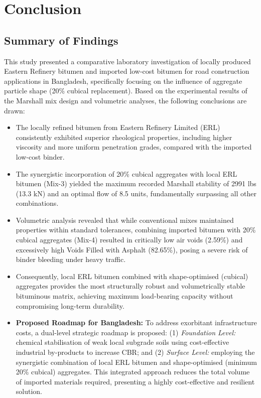 \documentclass[12pt,a4paper]{article}
\begin{document}
\section{Conclusion}

\subsection{Summary of Findings}
This study presented a comparative laboratory investigation of locally produced Eastern Refinery bitumen and imported low-cost bitumen for road construction applications in Bangladesh, specifically focusing on the influence of aggregate particle shape (20\% cubical replacement). Based on the experimental results of the Marshall mix design and volumetric analyses, the following conclusions are drawn:
\begin{itemize}
    \item The locally refined bitumen from Eastern Refinery Limited (ERL) consistently exhibited superior rheological properties, including higher viscosity and more uniform penetration grades, compared with the imported low-cost binder.
    \item The synergistic incorporation of 20\% cubical aggregates with local ERL bitumen (Mix-3) yielded the maximum recorded Marshall stability of 2991 lbs (13.3 kN) and an optimal flow of 8.5 units, fundamentally surpassing all other combinations.
    \item Volumetric analysis revealed that while conventional mixes maintained properties within standard tolerances, combining imported bitumen with 20\% cubical aggregates (Mix-4) resulted in critically low air voids (2.59\%) and excessively high Voids Filled with Asphalt (82.65\%), posing a severe risk of binder bleeding under heavy traffic.
    \item Consequently, local ERL bitumen combined with shape-optimised (cubical) aggregates provides the most structurally robust and volumetrically stable bituminous matrix, achieving maximum load-bearing capacity without compromising long-term durability.
    \item \textbf{Proposed Roadmap for Bangladesh:} To address exorbitant infrastructure costs, a dual-level strategic roadmap is proposed: (1) \textit{Foundation Level:} chemical stabilisation of weak local subgrade soils using cost-effective industrial by-products to increase CBR; and (2) \textit{Surface Level:} employing the synergistic combination of local ERL bitumen and shape-optimised (minimum 20\% cubical) aggregates. This integrated approach reduces the total volume of imported materials required, presenting a highly cost-effective and resilient solution.
\end{itemize}
\end{document}
